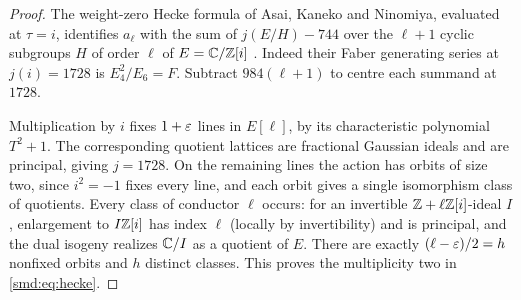 
\begin{proof}
The weight-zero Hecke formula of Asai, Kaneko and Ninomiya, evaluated at $\tau=i$,
identifies $a_\ell$ with the sum of $j(E/H)-744$ over the $\ell+1$ cyclic subgroups $H$ of
order $\ell$ of $E=\mathbb{C}/\mathbb{Z}[i]$ \cite[eq.~(5), Cor.~4]{Asai1997Zeros}. Indeed their Faber
generating series at $j(i)=1728$ is $E_4^2/E_6=F$. Subtract $984(\ell+1)$ to centre each
summand at $1728$.

Multiplication by $i$ fixes $1+\varepsilon$ lines in $E[\ell]$, by its characteristic polynomial
$T^2+1$. The corresponding quotient lattices are fractional Gaussian ideals and are
principal, giving $j=1728$. On the remaining lines the action has orbits of size two, since
$i^2=-1$ fixes every line, and each orbit gives a single isomorphism class of quotients.
Every class of conductor $\ell$ occurs: for an invertible $\mathbb{Z}+\ell\mathbb{Z}[i]$-ideal $I$,
enlargement to $I\mathbb{Z}[i]$ has index $\ell$ (locally by invertibility) and is principal, and
the dual isogeny realizes $\mathbb{C}/I$ as a quotient of $E$. There are exactly
$(\ell-\varepsilon)/2=h$ nonfixed orbits and $h$ distinct classes. This proves the multiplicity
two in \eqref{smd:eq:hecke}.
\end{proof}


